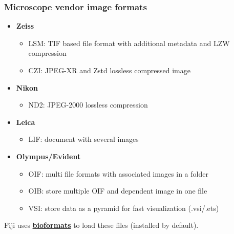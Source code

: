 \documentclass[ignorenonframetext,aspectratio=169,10pt,xcolor=table]{beamer}
\begin{document}
\begin{frame} \frametitle{Microscope vendor image formats}

  \begin{itemize}
    \item \textbf{Zeiss}
          \begin{itemize} \setlength\itemsep{1em}
            \item LSM: TIF based file format with additional metadata and LZW
                  compression
            \item CZI: JPEG-XR and Zstd lossless compressed image
          \end{itemize}
    \item \textbf{Nikon}
          \begin{itemize}
            \item ND2: JPEG-2000 lossless compression
          \end{itemize}
    \item \textbf{Leica}
          \begin{itemize}
            \item LIF: document with several images
          \end{itemize}
    \item \textbf{Olympus/Evident}
          \begin{itemize}
            \item OIF: multi file formats with associated images in a folder
            \item OIB: store multiple OIF and dependent image in one file
            \item VSI: store data as a pyramid for fast visualization (.vsi/.ets)
          \end{itemize}
  \end{itemize}

  Fiji uses \textbf{\href{https://imagej.net/formats/bio-formats}{bioformats}} to load these files (installed by default).

\end{frame}
\end{document}
